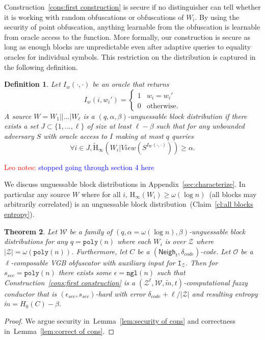 \documentclass[11pt]{article}
\newcommand{\apref}[1]{\mbox{Appendix~\ref{#1}}}
\newcommand{\lemref}[1]{\mbox{Lemma~\ref{#1}}}
\newcommand{\clref}[1]{\mbox{Claim~\ref{#1}}}
\newcommand{\consref}[1]{\mbox{Construction~\ref{#1}}}
\newcommand{\class}[1]{{\ensuremath{\mathsf{#1}}}}
\newcommand{\neigh}{\ensuremath{\class{Neigh}}\xspace}
\newcommand{\poly}{\ensuremath{\mathtt{poly}}\xspace}
\newcommand{\ngl}{\ensuremath{\mathtt{ngl}}\xspace}
\newcommand{\Hoo}{\mathrm{H}_\infty}
\newcommand{\Hav}{\tilde{\mathrm{H}}_\infty}
\newtheorem{theorem}{Theorem}[section]
\newtheorem{definition}[theorem]{Definition}
\newcommand{\authnote}[2]{{\textcolor{red}{\textsf{#1 notes: }\textcolor{blue}{ #2}}\marginpar{\textcolor{red}{\textbf{!!!!!}}}}}
\newcommand{\authnote}[2]{}
\newcommand{\lnote}[1]{{\authnote{Leo}{#1}}}
\begin{document}
\consref{cons:first construction} is secure if no distinguisher can tell whether it is working with random obfuscations or obfuscations of $W_i$.  By using the security of point obfuscation, anything learnable from the obfuscation is learnable from oracle access to the function.  More formally, our construction is secure as long as enough blocks are unpredictable even after adaptive queries to equality oracles for individual symbols. This restriction on the distribution is captured in the following definition.

\begin{definition}
\label{def:block guessable}
Let $I_w (\cdot, \cdot)$ be an oracle that returns \[I_w(i, w_i')=
\begin{cases}
1 & w_i = w_i'\\
0 & \text{otherwise}.
\end{cases}
\]
A source $W = W_1||...|W_\ell$ is a $(q, \alpha, \beta)$-\emph{unguessable block distribution} if there exists a set $J\subset\{1,..., \ell\}$ of size at least $\ell -\beta$ such that for any unbounded adversary $S$ with oracle access to $I$ making at most $q$ queries
\[
\forall i\in J, \Hav(W_i |View(S^{I_{W}(\cdot, \cdot)}))\geq \alpha.
\]
\end{definition}
\lnote{stopped going through section 4 here}

We discuss unguessable block distributions in \apref{sec:characterize}.  In particular any source $W$ where for all $i$, $\Hoo(W_i) \geq \omega(\log n)$~(all blocks may arbitrarily correlated) is an unguessable block distribution~(\clref{cl:all blocks entropy}).

\begin{theorem}
\label{thm:main thm first cons}
Let $\mathcal{W}$ be a family of $(q,\alpha= \omega(\log n),  \beta)$-unguessable block distributions for any $q = \poly(n)$ where each $W_i$ is over $\mathcal{Z}$ where $|\mathcal{Z}| = \omega(\poly(n))$.  Furthermore, let $C$ be a $(\neigh_t, \delta_{code})$-code.  Let $\mathcal{O}$ be a $\ell$-composable VGB obfuscator with auxiliary input for $\mathtt{I}_{\mathcal{Z}}$.  Then for $s_{sec} = \poly(n)$ there exists some $\epsilon=\ngl(n)$ such that \consref{cons:first construction} is a $(\mathcal{Z}^\ell, \mathcal{W}, \tilde{m}, t)$-computational fuzzy conductor that is $(\epsilon_{sec}, s_{sec})$-hard with error $\delta_{code} + \ell/|\mathcal{Z}|$ and resulting entropy $\tilde{m} =H_0(C)- \beta$.
\end{theorem}
\begin{proof}
We argue security in~\lemref{lem:security of cons} and correctness in~\lemref{lem:correct of cons}.
\end{proof}
\end{document}
